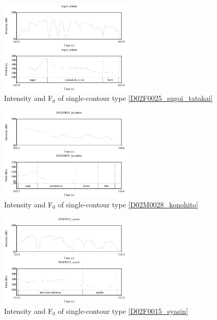 \begin{figure}
	\begin{center}
	\includegraphics[width=0.6\textwidth]{sounds/D02F0025_sugoi_tatakai.pdf}
	\caption{Intensity and F$_{0}$ of single-contour type \ref{D02F0025_sugoi_tatakai}}
	\label{D02F0025_sugoi_tatakaiF}
	\end{center}
\end{figure}
\begin{figure}
	\begin{center}
	\includegraphics[width=0.6\textwidth]{sounds/D02M0028_konohito.pdf}
	\caption{Intensity and F$_{0}$ of single-contour type \ref{D02M0028_konohito}}
	\label{D02M0028_konohitoF}
	\end{center}
\end{figure}
\begin{figure}
	\begin{center}
	\includegraphics[width=0.6\textwidth]{sounds/D02F0015_syasin.pdf}
	\caption{Intensity and F$_{0}$ of single-contour type \ref{D02F0015_syasin}}
	\label{D02F0015_syasinF}
	\end{center}
\end{figure}


